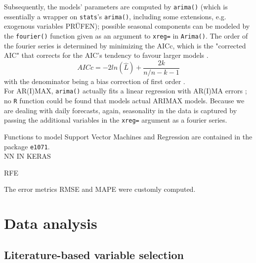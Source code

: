 \documentclass[a4paper, 11pt]{article}
\begin{document}
Subsequently, the models' parameters are computed by \texttt{arima()} (which is essentially a wrapper on \texttt{stats}'s \texttt{arima()}, including some extensions, e.g. exogenous variables PRÜFEN); possible seasonal components can be modeled by the \texttt{fourier()} function given as an argument to \texttt{xreg=} in \texttt{Arima()}. The order of the fourier series is determined by minimizing the AICc, which is the "corrected AIC" that corrects for the AIC's tendency to favour larger models \citep{Wit.2012}. \\
\begin{equation}
AICc = -2ln(\hat{L})+\frac{2k}{n/n-k-1}
\end{equation}
with the denominator being a bias correction of first order \citep{Wit.2012}.\\
For AR(I)MAX, \texttt{arima()} actually fits a linear regression with AR(I)MA errors \citep{Hyndman.2018}; no \texttt{R} function could be found that models actual ARIMAX models. Because we are dealing with daily forecasts, again, seasonality in the data is captured by passing the additional variables in the \texttt{xreg=} argument as a fourier series.

Functions to model Support Vector Machines and Regression are contained in the package \texttt{e1071}.\\

NN IN KERAS

RFE

The error metrics RMSE and MAPE were customly computed.\\





\section{Data analysis}
\subsection{Literature-based variable selection}
\end{document}
